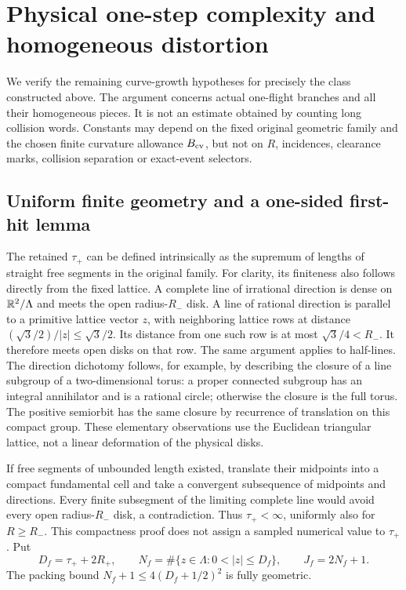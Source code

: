 \section{Physical one-step complexity and homogeneous distortion}
\label{sec:uc-complexity}
We verify the remaining curve-growth hypotheses for precisely the class
constructed above. The argument concerns actual one-flight branches and
all their homogeneous pieces. It is not an estimate obtained by counting
long collision words. Constants may depend on the fixed original geometric
family and the chosen finite curvature allowance $B_{\rm cv}$, but not on $R$,
incidences, clearance marks, collision separation or exact-event selectors.

\subsection{Uniform finite geometry and a one-sided first-hit lemma}
The retained $\tau_+$ can be defined intrinsically as the supremum of
lengths of straight free segments in the original family. For clarity, its
finiteness also follows directly from the fixed lattice. A complete line
of irrational direction is dense on $\mathbb R^2/\Lambda$ and meets the open
radius-$R_-$ disk. A line of rational direction is parallel to a primitive
lattice vector $z$, with neighboring lattice rows at distance
$(\sqrt3/2)/|z|\le\sqrt3/2$. Its distance from one such row is at most
$\sqrt3/4<R_-$. It therefore meets open disks on that row. The same
argument applies to half-lines. The direction dichotomy follows, for
example, by describing the closure of a line subgroup of a two-dimensional
torus: a proper connected subgroup has an integral annihilator and is a
rational circle; otherwise the closure is the full torus. The positive
semiorbit has the same closure by recurrence of translation on this compact
group. These elementary observations use the Euclidean triangular lattice,
not a linear deformation of the physical disks.

If free segments of unbounded length existed, translate their midpoints
into a compact fundamental cell and take a convergent subsequence of
midpoints and directions. Every finite subsegment of the limiting complete
line would avoid every open radius-$R_-$ disk, a contradiction. Thus
$\tau_+<\infty$, uniformly also for $R\ge R_-$. This compactness proof
does not assign a sampled numerical value to $\tau_+$.
Put
\begin{equation}\label{eq:uc-candidates}
 D_f=\tau_++2R_+,\qquad
 N_f=\#\{z\in\Lambda:0<|z|\le D_f\},\qquad J_f=2N_f+1.
\end{equation}
The packing bound $N_f+1\le4(D_f+1/2)^2$ is fully geometric.

